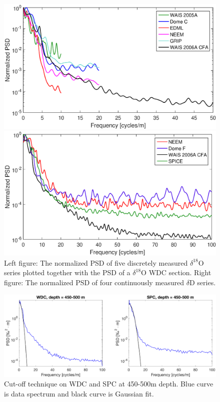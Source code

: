 \documentclass[draft, jgrga]{AGUTeX}
\begin{document}

\newpage

\begin{figure}[]
	\centering
	\begin{minipage}{.5\textwidth}
		\centering
		\includegraphics[width=0.9\linewidth]{PSD_discrete_plus_cfa_v1.eps}

	\end{minipage}%
	\begin{minipage}{0.5\textwidth}
		\centering
		\indent\includegraphics[width=0.9\linewidth]{PSD_CFA_v1.eps}

	\end{minipage}
	\caption{Left figure: The normalized PSD of five discretely measured $\delta^{18}$O series plotted together with the PSD of a $\delta^{18}$O WDC section. Right figure: The normalized PSD of four continuously measured $\delta$D series.}
\label{spectra_disVScfa}
\end{figure}

\begin{figure}
	\includegraphics[width=\linewidth]{cutoff.eps}
	\caption{Cut-off technique on WDC and SPC at 450-500m depth. Blue curve is data spectrum and black curve is Gaussian fit.} \label{cutoff}
\end{figure}
\end{document}
